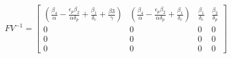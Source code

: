 \documentclass[preview]{standalone}
\begin{document}
\begin{align*}
FV^{-1} = \begin{bmatrix} ( \frac{\beta_4}{\alpha} - \frac{\epsilon_p \beta_2}{\alpha \delta_p} + \frac{\beta_1}{\delta_c} + \frac{\beta3}{\gamma} ) & (\frac{\beta_4}{\alpha} - \frac{\epsilon_p \beta_2}{\alpha \delta_p} + \frac{\beta_1}{\delta_c}) & \frac{\beta_1}{\delta_c} & \frac{\beta_2}{\delta_p} \\ 0 & 0 & 0 & 0 \\ 0 & 0 & 0 & 0 \\ 0 & 0 & 0 & 0 \end{bmatrix}
\end{align*}
\end{document}
